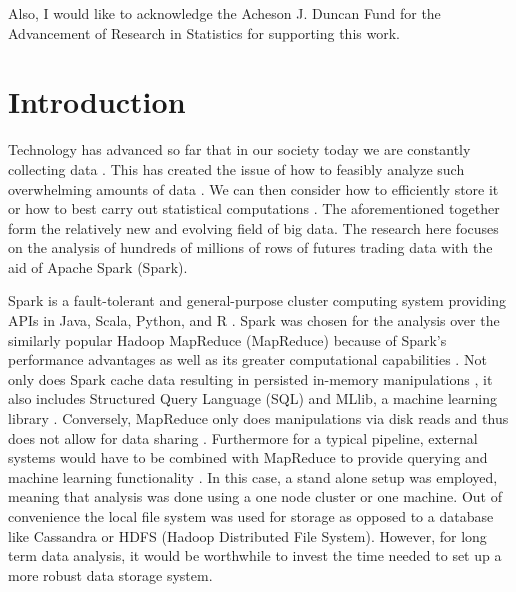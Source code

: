 \documentclass[12pt]{article}
\begin{document}
Also, I would like to acknowledge the Acheson J. Duncan Fund for the Advancement of Research in Statistics for supporting this work.
 
\newpage

\tableofcontents
\newpage
\begingroup
\renewcommand\numberline[1]{}
\listoftables
\newpage
\listoffigures
\endgroup
\newpage

\setcounter{page}{1}
\section*{Introduction}
Technology has advanced so far that in our society today we are constantly collecting data \cite{economist_10}. This has created the issue of how to feasibly analyze such overwhelming amounts of data \cite{economist_10}. We can then consider how to efficiently store it or how to best carry out statistical computations \cite{zaharia2016apache}. The aforementioned together form the relatively new and evolving field of big data. The research here focuses on the analysis of hundreds of millions of rows of futures trading data with the aid of Apache Spark (Spark). 

Spark is a fault-tolerant and general-purpose cluster computing system providing APIs in Java, Scala, Python, and R \cite{meng2016mllib}. Spark was chosen for the analysis over the similarly popular Hadoop MapReduce (MapReduce) because of Spark’s performance advantages as well as its greater computational capabilities \cite{zaharia2010spark}. Not only does Spark cache data resulting in persisted in-memory manipulations \cite{zaharia2012resilient}, it also includes Structured Query Language (SQL) and MLlib, a machine learning library \cite{meng2016mllib}. Conversely, MapReduce only does manipulations via disk reads and thus does not allow for data sharing \cite{zaharia2016apache}. Furthermore for a typical pipeline, external systems would have to be combined with MapReduce to provide querying and machine learning functionality \cite{zaharia2016apache}. In this case, 
a stand alone setup was employed, meaning that analysis was done using a one node cluster or one machine. Out of convenience the local file system was used for storage as opposed to a database like Cassandra or HDFS (Hadoop Distributed File System). However, for long term data analysis, it would be worthwhile to invest the time needed to set up a more robust data storage system. 
\end{document}
